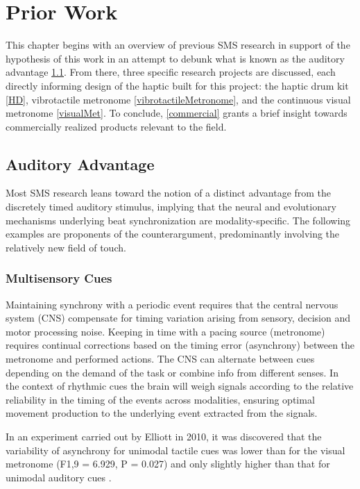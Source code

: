 \chapter{Prior Work}

This chapter begins with an overview of previous SMS research in support of the hypothesis of this work in an attempt to debunk what is known as the auditory advantage \ref{AudAdv}. From there, three specific research projects are discussed, each directly informing design of the haptic built for this project: the haptic drum kit \ref{HD}, vibrotactile metronome \ref{vibrotactileMetronome}, and the continuous visual metronome \ref{visualMet}. To conclude, \ref{commercial} grants a brief insight towards commercially realized products relevant to the field.

\section{Auditory Advantage} \label{AudAdv}
Most SMS research leans toward the notion of a distinct advantage from the discretely timed auditory stimulus, implying that the neural and evolutionary mechanisms underlying beat synchronization are modality-specific. The following examples are proponents of the counterargument, predominantly involving the relatively new field of touch.

\subsection{Multisensory Cues}
Maintaining synchrony with a periodic event requires that the central nervous system (CNS) compensate for timing variation arising from sensory, decision and motor processing noise. Keeping in time with a pacing source (metronome) requires continual corrections based on the timing error (asynchrony) between the metronome and performed actions. The CNS can alternate between cues depending on the demand of the task or combine info from different senses. In the context of rhythmic cues the brain will weigh signals according to the relative reliability in the timing of the events across modalities, ensuring optimal movement production to the underlying event extracted from the signals.

In an experiment carried out by Elliott in 2010, it was discovered that the variability of asynchrony for unimodal tactile cues was lower than for the visual metronome (F1,9 = 6.929, P = 0.027) and only slightly higher than that for unimodal auditory cues \cite{elliott2010multisensory}.

